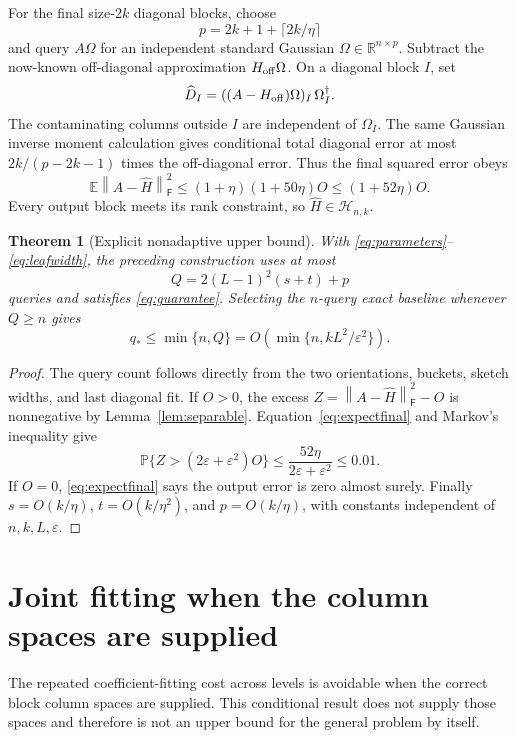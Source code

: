 \documentclass[11pt]{article}
\newtheorem{theorem}{Theorem}[section]
\theoremstyle{remark}
\newcommand{\R}{\mathbb R}
\newcommand{\E}{\mathbb E}
\newcommand{\Prob}{\mathbb P}
\newcommand{\F}{\mathsf F}
\newcommand{\Hclass}{\mathcal H_{n,k}}
\newcommand{\eps}{\varepsilon}
\newcommand{\norm}[1]{\left\lVert #1\right\rVert}
\begin{document}
For the final size-$2k$ diagonal blocks, choose
\begin{equation}\label{eq:leafwidth}
 p=2k+1+\lceil2k/\eta\rceil
\end{equation}
and query $A\Omega$ for an independent standard Gaussian
$\Omega\in\R^{n\times p}$. Subtract the now-known off-diagonal
approximation $H_{\rm off}\Omega$. On a diagonal block $I$, set
\[
 \widehat D_I=((A-H_{\rm off})\Omega)_I\,\Omega_I^\dagger.
\]
The contaminating columns outside $I$ are independent of $\Omega_I$.
The same Gaussian inverse moment calculation gives conditional total
diagonal error at most
$2k/(p-2k-1)$ times the off-diagonal error. Thus the final squared error obeys
\begin{equation}\label{eq:expectfinal}
 \E\norm{A-\widehat H}_\F^2
 \le(1+\eta)(1+50\eta)O\le(1+52\eta)O.
\end{equation}
Every output block meets its rank constraint, so $\widehat H\in\Hclass$.

\begin{theorem}[Explicit nonadaptive upper bound]\label{thm:upper}
With \eqref{eq:parameters}--\eqref{eq:leafwidth}, the preceding construction
uses at most
\begin{equation}\label{eq:budget}
 Q=2(L-1)^2(s+t)+p
\end{equation}
queries and satisfies \eqref{eq:guarantee}. Selecting the $n$-query exact
baseline whenever $Q\ge n$ gives
\[
 q_*\le\min\{n,Q\}=O\!\left(\min\{n,kL^2/\eps^2\}\right).
\]
\end{theorem}
\begin{proof}
The query count follows directly from the two orientations, buckets, sketch
widths, and last diagonal fit. If $O>0$, the excess
$Z=\norm{A-\widehat H}_\F^2-O$ is nonnegative by
Lemma~\ref{lem:separable}. Equation~\eqref{eq:expectfinal} and Markov's
inequality give
\[
 \Prob\{Z>(2\eps+\eps^2)O\}
 \le\frac{52\eta}{2\eps+\eps^2}\le0.01.
\]
If $O=0$, \eqref{eq:expectfinal} says the output error is zero almost surely.
Finally $s=O(k/\eta)$, $t=O(k/\eta^2)$, and $p=O(k/\eta)$,
with constants independent of $n,k,L,\eps$.
\end{proof}

\section{Joint fitting when the column spaces are supplied}\label{sec:jointfit}

The repeated coefficient-fitting cost across levels is avoidable when the
correct block column spaces are supplied. This conditional result does not
supply those spaces and therefore is not an upper bound for the general
problem by itself.
\end{document}
